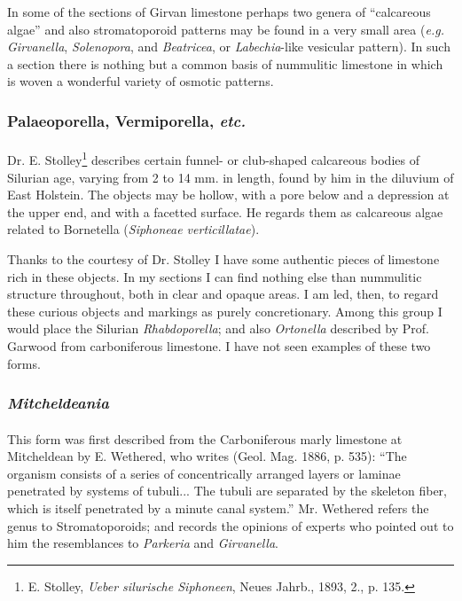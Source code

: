 \documentclass[a4paper, 12pt, oneside]{article}
\begin{document}
In some of the sections of Girvan limestone perhaps two genera of ``calcareous algae'' and also stromatoporoid patterns may be found in a very small area (\emph{e.g.} \emph{Girvanella}, \emph{Solenopora}, and \emph{Beatricea}, or \emph{Labechia}-like vesicular pattern). In such a section there is nothing but a common basis of nummulitic limestone in which is woven a wonderful variety of osmotic patterns.

\subsubsection{Palaeoporella, Vermiporella, \emph{etc.}}
\paragraph{}
Dr. E. Stolley\footnote{E. Stolley, \emph{Ueber silurische Siphoneen}, Neues Jahrb., 1893, 2., p. 135.} describes certain funnel- or club-shaped calcareous bodies of Silurian age, varying from 2 to 14 mm. in length, found by him in the diluvium of East Holstein. The objects may be hollow, with a pore below and a depression at the upper end, and with a facetted surface. He regards them as calcareous algae related to Bornetella (\emph{Siphoneae verticillatae}).

Thanks to the courtesy of Dr. Stolley I have some authentic pieces of limestone rich in these objects. In my sections I can find nothing else than nummulitic structure throughout, both in clear and opaque areas. I am led, then, to regard these curious objects and markings as purely concretionary. Among this group I would place the Silurian \emph{Rhabdoporella}; and also \emph{Ortonella} described by Prof. Garwood from carboniferous limestone. I have not seen examples of these two forms.

\subsubsection{\emph{Mitcheldeania}}
\paragraph{}
This form was first described from the Carboniferous marly limestone at Mitcheldean by E. Wethered, who writes (Geol. Mag. 1886, p. 535): ``The organism consists of a series of concentrically arranged layers or laminae penetrated by systems of tubuli... The tubuli are separated by the skeleton fiber, which is itself penetrated by a minute canal system.'' Mr. Wethered refers the genus to Stromatoporoids; and records the opinions of experts who pointed out to him the resemblances to \emph{Parkeria} and \emph{Girvanella}.
\end{document}
